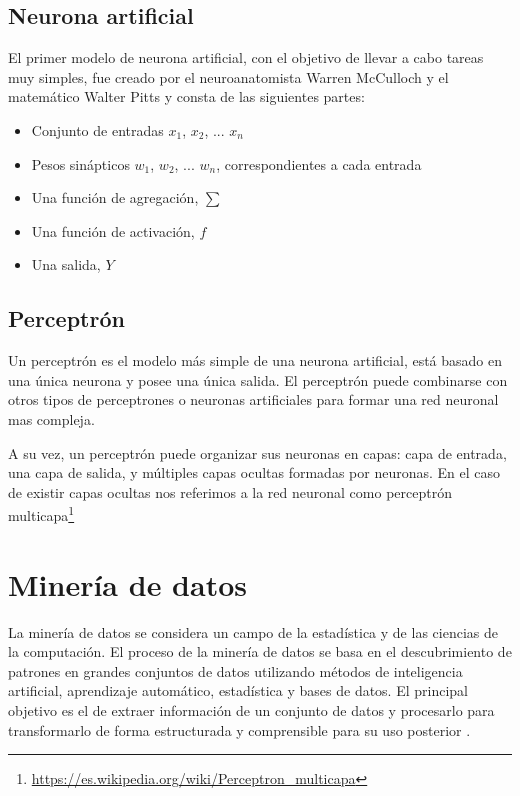 \subsection{Neurona artificial}
El primer modelo de neurona artificial, con el objetivo de llevar a cabo tareas muy simples, fue creado por el neuroanatomista Warren McCulloch y el matemático Walter Pitts y consta de las siguientes partes:
\begin{itemize}
    \item Conjunto de entradas $x_1$, $x_2$, ... $x_n$
    \item Pesos sinápticos $w_1$, $w_2$, ... $w_n$, correspondientes a cada entrada
    \item Una función de agregación, $\sum$
    \item Una función de activación, $f$
    \item Una salida, $Y$
\end{itemize}

\subsection{Perceptrón}
 Un perceptrón es el modelo más simple de una neurona artificial, está basado en una única neurona y posee una única salida. El perceptrón puede combinarse con otros tipos de perceptrones o neuronas artificiales para formar una red neuronal mas compleja.
 
 A su vez, un perceptrón puede organizar sus neuronas en capas: capa de entrada, una capa de salida, y múltiples capas ocultas formadas por neuronas. En el caso de existir capas ocultas nos referimos a la red neuronal como perceptrón multicapa\footnote{\url{https://es.wikipedia.org/wiki/Perceptron\_multicapa}}


\section{Minería de datos}

La minería de datos se considera un campo de la estadística y de las ciencias de la computación. El proceso de la minería de datos se basa en el descubrimiento de patrones en grandes conjuntos de datos utilizando métodos de inteligencia artificial, aprendizaje automático, estadística y bases de datos. El principal objetivo es el de extraer información de un conjunto de datos y procesarlo para transformarlo de forma estructurada y comprensible para su uso posterior \cite{wiki:mineria_de_datos}.

